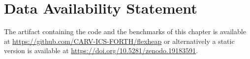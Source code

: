 \section{Data Availability Statement}
The artifact containing the code and the benchmarks of this chapter is available at \url{https://github.com/CARV-ICS-FORTH/flexheap} or alternatively a static version is available at \url{https://doi.org/10.5281/zenodo.19183591}.
